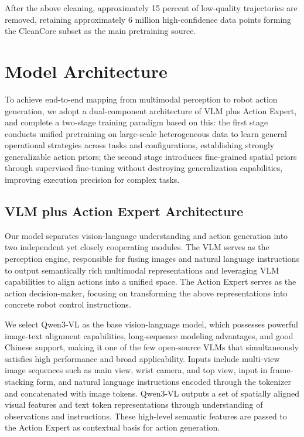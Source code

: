 \documentclass[11pt,a4paper]{article}
\begin{document}
After the above cleaning, approximately 15 percent of low-quality trajectories are removed, retaining approximately 6 million high-confidence data points forming the CleanCore subset as the main pretraining source.

\section{Model Architecture}

To achieve end-to-end mapping from multimodal perception to robot action generation, we adopt a dual-component architecture of VLM plus Action Expert, and complete a two-stage training paradigm based on this: the first stage conducts unified pretraining on large-scale heterogeneous data to learn general operational strategies across tasks and configurations, establishing strongly generalizable action priors; the second stage introduces fine-grained spatial priors through supervised fine-tuning without destroying generalization capabilities, improving execution precision for complex tasks.

\subsection{VLM plus Action Expert Architecture}

Our model separates vision-language understanding and action generation into two independent yet closely cooperating modules. The VLM serves as the perception engine, responsible for fusing images and natural language instructions to output semantically rich multimodal representations and leveraging VLM capabilities to align actions into a unified space. The Action Expert serves as the action decision-maker, focusing on transforming the above representations into concrete robot control instructions.

We select Qwen3-VL as the base vision-language model, which possesses powerful image-text alignment capabilities, long-sequence modeling advantages, and good Chinese support, making it one of the few open-source VLMs that simultaneously satisfies high performance and broad applicability. Inputs include multi-view image sequences such as main view, wrist camera, and top view, input in frame-stacking form, and natural language instructions encoded through the tokenizer and concatenated with image tokens. Qwen3-VL outputs a set of spatially aligned visual features and text token representations through understanding of observations and instructions. These high-level semantic features are passed to the Action Expert as contextual basis for action generation.
\end{document}
